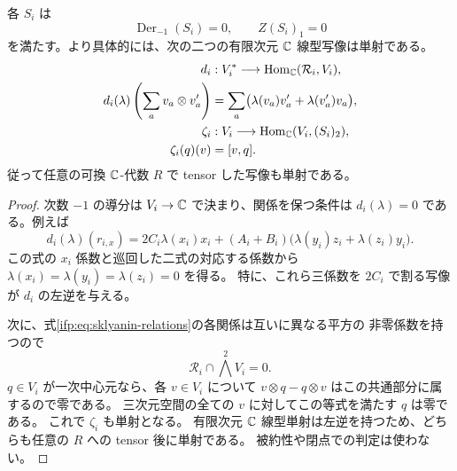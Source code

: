 \begin{lemma}[負一次導分と一次中心の消滅]
\label{ifp:lem:low-degree}
各 $S_i$ は
\[
       \operatorname{Der}_{-1}(S_i)=0,
             \qquad Z(S_i)_1=0
\]
を満たす。より具体的には、次の二つの有限次元 $\mathbb C$ 線型写像は単射である。
\begin{equation}\label{ifp:eq:two-injections}
\begin{aligned}
 d_i&:V_i^*\longrightarrow\operatorname{Hom}_{\mathbb C}(\mathcal R_i,V_i),\\
 d_i(\lambda)\left(\sum_a v_a\otimes v'_a\right)
   &=\sum_a\bigl(\lambda(v_a)v'_a+\lambda(v'_a)v_a\bigr),\\
 \zeta_i&:V_i\longrightarrow\operatorname{Hom}_{\mathbb C}(V_i,(S_i)_2),\\
 \zeta_i(q)(v)&=[v,q].
\end{aligned}
\end{equation}
従って任意の可換 $\mathbb C$-代数 $R$ で tensor した写像も単射である。
\end{lemma}

\begin{proof}
次数 $-1$ の導分は $V_i\to\mathbb C$ で決まり、関係を保つ条件は
$d_i(\lambda)=0$ である。例えば
\[
 d_i(\lambda)(r_{i,x})
 =2C_i\lambda(x_i)x_i
 +(A_i+B_i)\bigl(\lambda(y_i)z_i+\lambda(z_i)y_i\bigr).
\]
この式の $x_i$ 係数と巡回した二式の対応する係数から
$\lambda(x_i)=\lambda(y_i)=\lambda(z_i)=0$ を得る。
特に、これら三係数を $2C_i$ で割る写像が $d_i$ の左逆を与える。

次に、式\eqref{ifp:eq:sklyanin-relations}の各関係は互いに異なる平方の
非零係数を持つので
\[
                  \mathcal R_i\cap\bigwedge^2V_i=0.
\]
$q\in V_i$ が一次中心元なら、各 $v\in V_i$ について
$v\otimes q-q\otimes v$ はこの共通部分に属するので零である。
三次元空間の全ての $v$ に対してこの等式を満たす $q$ は零である。
これで $\zeta_i$ も単射となる。
有限次元 $\mathbb C$ 線型単射は左逆を持つため、どちらも任意の $R$ への tensor 後に単射である。
被約性や閉点での判定は使わない。
\end{proof}

